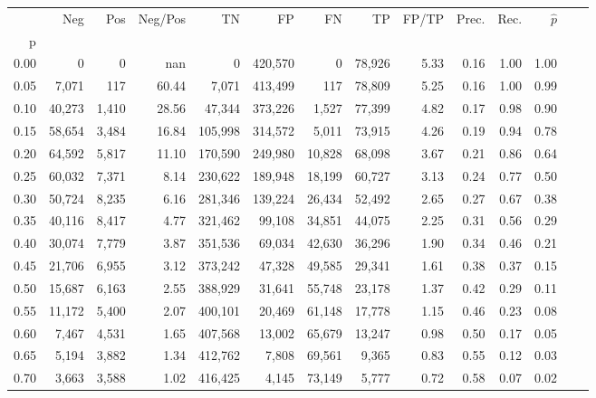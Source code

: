 \begin{tabular}{rrrrrrrrrrrrrr}
\toprule
{} &     Neg &    Pos & Neg/Pos &       TN &       FP &      FN &      TP & FP/TP & Prec. &  Rec. & $\hat{p}$ \\
p    &         &        &         &          &          &         &         &       &       &       &           \\
\midrule
0.00 &       0 &      0 &     nan &        0 &  420,570 &       0 &  78,926 &  5.33 &  0.16 &  1.00 &      1.00 \\
0.05 &   7,071 &    117 &   60.44 &    7,071 &  413,499 &     117 &  78,809 &  5.25 &  0.16 &  1.00 &      0.99 \\
0.10 &  40,273 &  1,410 &   28.56 &   47,344 &  373,226 &   1,527 &  77,399 &  4.82 &  0.17 &  0.98 &      0.90 \\
0.15 &  58,654 &  3,484 &   16.84 &  105,998 &  314,572 &   5,011 &  73,915 &  4.26 &  0.19 &  0.94 &      0.78 \\
0.20 &  64,592 &  5,817 &   11.10 &  170,590 &  249,980 &  10,828 &  68,098 &  3.67 &  0.21 &  0.86 &      0.64 \\
0.25 &  60,032 &  7,371 &    8.14 &  230,622 &  189,948 &  18,199 &  60,727 &  3.13 &  0.24 &  0.77 &      0.50 \\
0.30 &  50,724 &  8,235 &    6.16 &  281,346 &  139,224 &  26,434 &  52,492 &  2.65 &  0.27 &  0.67 &      0.38 \\
0.35 &  40,116 &  8,417 &    4.77 &  321,462 &   99,108 &  34,851 &  44,075 &  2.25 &  0.31 &  0.56 &      0.29 \\
0.40 &  30,074 &  7,779 &    3.87 &  351,536 &   69,034 &  42,630 &  36,296 &  1.90 &  0.34 &  0.46 &      0.21 \\
0.45 &  21,706 &  6,955 &    3.12 &  373,242 &   47,328 &  49,585 &  29,341 &  1.61 &  0.38 &  0.37 &      0.15 \\
0.50 &  15,687 &  6,163 &    2.55 &  388,929 &   31,641 &  55,748 &  23,178 &  1.37 &  0.42 &  0.29 &      0.11 \\
0.55 &  11,172 &  5,400 &    2.07 &  400,101 &   20,469 &  61,148 &  17,778 &  1.15 &  0.46 &  0.23 &      0.08 \\
0.60 &   7,467 &  4,531 &    1.65 &  407,568 &   13,002 &  65,679 &  13,247 &  0.98 &  0.50 &  0.17 &      0.05 \\
0.65 &   5,194 &  3,882 &    1.34 &  412,762 &    7,808 &  69,561 &   9,365 &  0.83 &  0.55 &  0.12 &      0.03 \\
0.70 &   3,663 &  3,588 &    1.02 &  416,425 &    4,145 &  73,149 &   5,777 &  0.72 &  0.58 &  0.07 &      0.02 \\

\end{tabular}
